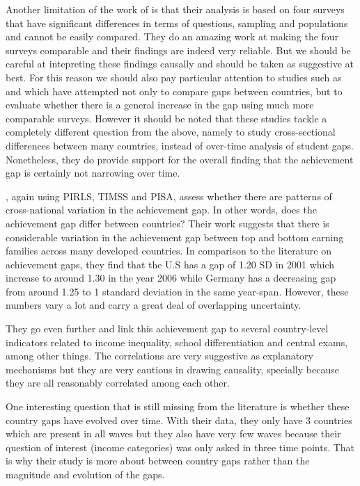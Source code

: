 \documentclass[11pt, a4paper]{article}\usepackage[]{graphicx}\usepackage[]{color}
\begin{document}
Another limitation of the work of \citet{bradbury2015} is that their analysis is based on four surveys that have significant differences in terms of questions, sampling and populations and cannot be easily compared. They do an amazing work at making the four surveys comparable and their findings are indeed very reliable.  But we should be careful at intepreting these findings causally and should be taken as suggestive at best. For this reason we should also pay particular attention to studies such as \citet{anna2016} and \citet{anna2016_global} which have attempted not only to compare gaps between countries, but to evaluate whether there is a general increase in the gap using much more comparable surveys. However it should be noted that these studies tackle a completely different question from the above, namely to study cross-sectional differences between many countries, instead of over-time analysis of student gaps. Nonetheless, they do provide support for the overall finding that the achievement gap is certainly not narrowing over time.

\citet{anna2016}, again using PIRLS, TIMSS and PISA, assess whether there are patterns of cross-national variation in the achievement gap. In other words, does the achievement gap differ between countries? Their work suggests that there is considerable variation in the achievement gap between top and bottom earning families across many developed countries. In comparison to the literature on achievement gaps, they find that the U.S has a gap of 1.20 SD in 2001 which increase to around 1.30 in the year 2006 while Germany has a decreasing gap from around 1.25 to 1 standard deviation in the same year-span. However, these numbers vary a lot and carry a great deal of overlapping uncertainty.

They go even further and link this achievement gap to several country-level indicators related to income inequality, school differentiation and central exams, among other things. The correlations are very suggestive  as explanatory mechanisms but they are very cautious in drawing causality, specially because they are all reasonably correlated among each other.

One interesting question that is still missing from the literature is whether these country gaps have evolved over time. With their data, they only have 3 countries which are present in all waves but they also have very few waves because their question of interest (income categories) was only asked in three time points. That is why their study is more about between country gaps rather than the magnitude and evolution of the gaps.
\end{document}
